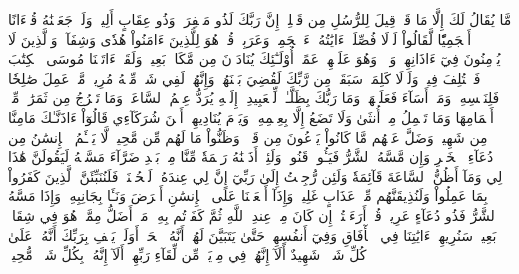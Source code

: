 مَّا يُقَالُ لَكَ إِلَّا مَا قَدۡ قِيلَ لِلرُّسُلِ مِن قَبۡلِكَۚ إِنَّ رَبَّكَ لَذُو مَغۡفِرَةٖ وَذُو عِقَابٍ أَلِيمٖ
وَلَوۡ جَعَلۡنَٰهُ قُرۡءَانًا أَعۡجَمِيّٗا لَّقَالُواْ لَوۡلَا فُصِّلَتۡ ءَايَٰتُهُۥٓۖ ءَا۬عۡجَمِيّٞ وَعَرَبِيّٞۗ قُلۡ هُوَ لِلَّذِينَ ءَامَنُواْ هُدٗى وَشِفَآءٞۚ وَٱلَّذِينَ لَا يُؤۡمِنُونَ فِيٓ ءَاذَانِهِمۡ وَقۡرٞ وَهُوَ عَلَيۡهِمۡ عَمًىۚ أُوْلَـٰٓئِكَ يُنَادَوۡنَ مِن مَّكَانِۭ بَعِيدٖ
وَلَقَدۡ ءَاتَيۡنَا مُوسَى ٱلۡكِتَٰبَ فَٱخۡتُلِفَ فِيهِۚ وَلَوۡلَا كَلِمَةٞ سَبَقَتۡ مِن رَّبِّكَ لَقُضِيَ بَيۡنَهُمۡۚ وَإِنَّهُمۡ لَفِي شَكّٖ مِّنۡهُ مُرِيبٖ
مَّنۡ عَمِلَ صَٰلِحٗا فَلِنَفۡسِهِۦۖ وَمَنۡ أَسَآءَ فَعَلَيۡهَاۗ وَمَا رَبُّكَ بِظَلَّـٰمٖ لِّلۡعَبِيدِ
۞إِلَيۡهِ يُرَدُّ عِلۡمُ ٱلسَّاعَةِۚ وَمَا تَخۡرُجُ مِن ثَمَرَٰتٖ مِّنۡ أَكۡمَامِهَا وَمَا تَحۡمِلُ مِنۡ أُنثَىٰ وَلَا تَضَعُ إِلَّا بِعِلۡمِهِۦۚ وَيَوۡمَ يُنَادِيهِمۡ أَيۡنَ شُرَكَآءِي قَالُوٓاْ ءَاذَنَّـٰكَ مَامِنَّا مِن شَهِيدٖ
وَضَلَّ عَنۡهُم مَّا كَانُواْ يَدۡعُونَ مِن قَبۡلُۖ وَظَنُّواْ مَا لَهُم مِّن مَّحِيصٖ
لَّا يَسۡـَٔمُ ٱلۡإِنسَٰنُ مِن دُعَآءِ ٱلۡخَيۡرِ وَإِن مَّسَّهُ ٱلشَّرُّ فَيَـُٔوسٞ قَنُوطٞ
وَلَئِنۡ أَذَقۡنَٰهُ رَحۡمَةٗ مِّنَّا مِنۢ بَعۡدِ ضَرَّآءَ مَسَّتۡهُ لَيَقُولَنَّ هَٰذَا لِي وَمَآ أَظُنُّ ٱلسَّاعَةَ قَآئِمَةٗ وَلَئِن رُّجِعۡتُ إِلَىٰ رَبِّيٓ إِنَّ لِي عِندَهُۥ لَلۡحُسۡنَىٰۚ فَلَنُنَبِّئَنَّ ٱلَّذِينَ كَفَرُواْ بِمَا عَمِلُواْ وَلَنُذِيقَنَّهُم مِّنۡ عَذَابٍ غَلِيظٖ
وَإِذَآ أَنۡعَمۡنَا عَلَى ٱلۡإِنسَٰنِ أَعۡرَضَ وَنَـَٔا بِجَانِبِهِۦ وَإِذَا مَسَّهُ ٱلشَّرُّ فَذُو دُعَآءٍ عَرِيضٖ
قُلۡ أَرَءَيۡتُمۡ إِن كَانَ مِنۡ عِندِ ٱللَّهِ ثُمَّ كَفَرۡتُم بِهِۦ مَنۡ أَضَلُّ مِمَّنۡ هُوَ فِي شِقَاقِۭ بَعِيدٖ
سَنُرِيهِمۡ ءَايَٰتِنَا فِي ٱلۡأٓفَاقِ وَفِيٓ أَنفُسِهِمۡ حَتَّىٰ يَتَبَيَّنَ لَهُمۡ أَنَّهُ ٱلۡحَقُّۗ أَوَلَمۡ يَكۡفِ بِرَبِّكَ أَنَّهُۥ عَلَىٰ كُلِّ شَيۡءٖ شَهِيدٌ
أَلَآ إِنَّهُمۡ فِي مِرۡيَةٖ مِّن لِّقَآءِ رَبِّهِمۡۗ أَلَآ إِنَّهُۥ بِكُلِّ شَيۡءٖ مُّحِيطُۢ